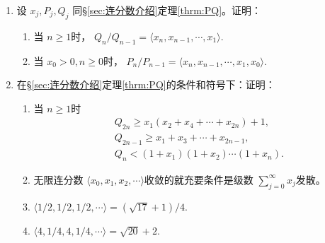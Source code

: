 \begin{exercise}
\begin{enumerate}
		\item 设 \( {x_j},{P_j},{Q_j} \) 同\S \ref{sec:连分数介绍}定理\ref{thrm:PQ}。证明：
		      \begin{enumerate}[label=(\roman*)]
			      \item 当 \( n \geqslant 1\)时， \( Q_n/Q_{n-1} = \langle x_n, x_{n-1}, \cdots, x_1 \rangle. \)
			      \item 当 \( x_0 > 0, n \geqslant 0 \)时， 	\( P_n/P_{n-1} = \langle x_n, x_{n-1}, \cdots, x_1, x_0
			            \rangle. \)
		      \end{enumerate}
		\item 在\S\ref{sec:连分数介绍}定理\ref{thrm:PQ}的条件和符号下：证明：
		      \begin{enumerate}[label=(\roman*)]
			      \item 当 \( n \geqslant 1 \)时
			            \begin{align*}
				             & Q_{2n} \geqslant x_1(x_2 + x_4 + \cdots + x_{2n}) + 1, \\
				             & Q_{2n-1} \geqslant x_1 + x_3 + \cdots + x_{2n-1},      \\
				             & Q_n < (1 + x_1)(1+x_2)\cdots(1+x_n).
			            \end{align*}
			      \item 无限连分数 \( \langle x_0, x_1, x_2, \cdots \rangle \)收敛的就充要条件是级数 \( \displaystyle
			            \sum_{j=0}^{\infty}x_j \)发散。
			      \item \( \langle 1/2, 1/2, 1/2, \cdots \rangle = (\sqrt{17} + 1)/4. \)
			      \item \( \langle 4,1/4,4,1/4, \cdots \rangle = \sqrt{20} + 2. \)
		      \end{enumerate}


\end{enumerate}
\end{exercise}
